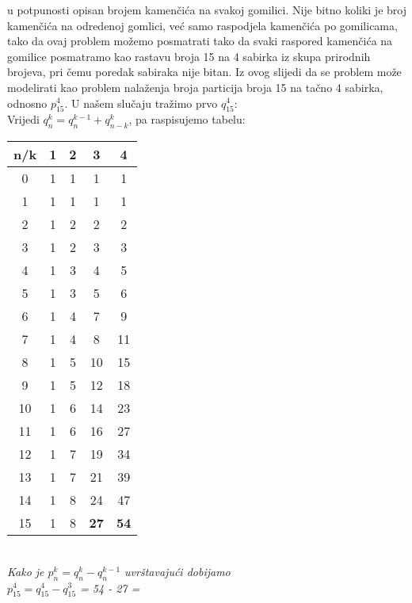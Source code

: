 \documentclass[12pt]{article}
\begin{document}
\begin{enumerate}
\begin{center}
{u potpunosti opisan brojem kamenčića na svakoj gomilici. Nije bitno koliki
je broj kamenčića na odredenoj gomlici, već samo raspodjela kamenčića po
gomilicama, tako da ovaj problem možemo posmatrati tako da svaki raspored
kamenčića na gomilice posmatramo kao rastavu broja 15 na 4 sabirka iz skupa
prirodnih brojeva, pri čemu poredak sabiraka nije bitan. Iz ovog slijedi da se
problem može modelirati kao problem nalaženja broja particija broja 15 na tačno 4 sabirka, odnosno $p^4_{15}$. U našem slučaju tražimo prvo $q^4_{15}$:\\
\vspace{0.20cm}
		Vrijedi $q^k_n = q^{k-1}_n + q^k_{n-k}$, pa raspisujemo tabelu:\\
		}
		\vspace{0.35cm}
			\begin{tabular}{c|c|c|c|c}
		         n/k & 1 & 2 & 3 & 4    \\
		    \hline 0 & 1 & 1 & 1 & 1 \\
		    \hline 1 & 1 & 1 & 1 & 1  \\
		    \hline 2 & 1 & 2 & 2 & 2  \\
		    \hline 3 & 1 & 2 & 3 & 3  \\
		    \hline 4 & 1 & 3 & 4 & 5  \\
		    \hline 5 & 1 & 3 & 5 & 6  \\
		    \hline 6 & 1 & 4 & 7 & 9 \\
		    \hline 7 & 1 & 4 & 8 & 11  \\
		    \hline 8 & 1 & 5 & 10 & 15  \\
		    \hline 9 & 1 & 5 & 12 & 18 \\
		    \hline 10 & 1 & 6 & 14 & 23  \\
		    \hline 11 & 1 & 6 & 16 & 27  \\
		    \hline 12 & 1 & 7 & 19 & 34  \\
		    \hline 13 & 1 & 7 & 21 & 39  \\
		    \hline 14 & 1 & 8 & 24 & 47  \\
		    \hline 15 & 1 & 8 & \textbf{27} & \textbf{54} \\
		\end{tabular}\\
		\vspace{0.35cm}
		\textit{Kako je $p^k_n = q^k_n - q^{k-1}_n$ uvrštavajući dobijamo\\
		\vspace{0.15cm}
		$p^4_{15} = q^4_{15} - q^{3}_{15} $ = 54 - 27 = 
}
\end{center}
\end{enumerate}
\end{document}
